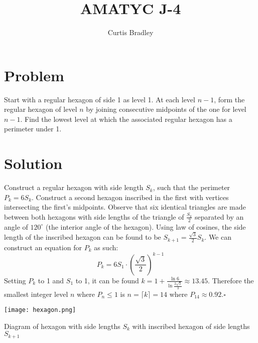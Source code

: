 \documentclass{article}
\title{AMATYC J-4}
\author{Curtis Bradley}
\begin{document}
\setlength{\droptitle}{-4cm}
\maketitle

\section{Problem} Start with a regular hexagon of side 1 as level 1. At each level $n -1$, form the regular hexagon of level $n$ by joining consecutive midpoints of the one for level $n-1$. Find the lowest level at which the associated regular hexagon has a perimeter under 1.
\section{Solution}
Construct a regular hexagon with side length $S_k$, such that the perimeter $P_k = 6S_k$. 
Construct a second hexagon inscribed in the first with vertices intersecting the first's midpoints. 
Observe that six identical triangles are made between both hexagons with side lengths of the triangle of $\frac{S_k}{2}$ separated by an angle of $120^\circ$ (the interior angle of the hexagon). 
Using law of cosines, the side length of the inscribed hexagon can be found to be  $S_{k+1} = \frac{\sqrt{3}}{2}S_k$. 
We can construct an equation for $P_k$ as such:
\[P_k = 6 S_1 \cdot\left(\frac{\sqrt{3}}{2}\right)^{k-1}\]
Setting $P_k$ to 1 and $S_1$ to 1, it can be found $k=1 + \frac{\ln{6}}{\ln{\frac{2\sqrt{3}}{3}}} \approx 13.45$. Therefore the smallest integer level $n$ where $P_n \leq 1$ is $n = \lceil{k}\rceil = 14$ where $P_{14}\approx0.92$.$\square$


\begin{center}
    \texttt{[image: hexagon.png]}

    Diagram of hexagon with side lengths $S_k$ with inscribed hexagon of side lengths $S_{k+1}$
\end{center}
\end{document}
